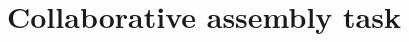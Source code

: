 \documentclass[10pt,letterpaper]{article}
\begin{document}







\section{Collaborative assembly task}
\end{document}
